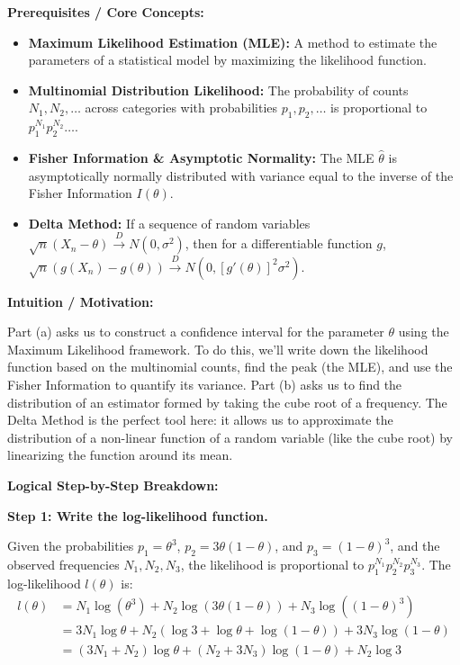 \begin{solution}
\textbf{Prerequisites / Core Concepts:}
\begin{itemize}
    \item \textbf{Maximum Likelihood Estimation (MLE):} A method to estimate the parameters of a statistical model by maximizing the likelihood function.
    \item \textbf{Multinomial Distribution Likelihood:} The probability of counts $N_1, N_2, \dots$ across categories with probabilities $p_1, p_2, \dots$ is proportional to $p_1^{N_1} p_2^{N_2} \dots$.
    \item \textbf{Fisher Information \& Asymptotic Normality:} The MLE $\hat{\theta}$ is asymptotically normally distributed with variance equal to the inverse of the Fisher Information $I(\theta)$.
    \item \textbf{Delta Method:} If a sequence of random variables $\sqrt{n}(X_n - \theta) \xrightarrow{D} N(0, \sigma^2)$, then for a differentiable function $g$, $\sqrt{n}(g(X_n) - g(\theta)) \xrightarrow{D} N(0, [g'(\theta)]^2 \sigma^2)$.
\end{itemize}

\textbf{Intuition / Motivation:}

Part (a) asks us to construct a confidence interval for the parameter $\theta$ using the Maximum Likelihood framework. To do this, we'll write down the likelihood function based on the multinomial counts, find the peak (the MLE), and use the Fisher Information to quantify its variance.
Part (b) asks us to find the distribution of an estimator formed by taking the cube root of a frequency. The Delta Method is the perfect tool here: it allows us to approximate the distribution of a non-linear function of a random variable (like the cube root) by linearizing the function around its mean.

\textbf{Logical Step-by-Step Breakdown:}

\textbf{Step 1: Write the log-likelihood function.}

Given the probabilities $p_1 = \theta^3$, $p_2 = 3\theta(1-\theta)$, and $p_3 = (1-\theta)^3$, and the observed frequencies $N_1, N_2, N_3$, the likelihood is proportional to $p_1^{N_1} p_2^{N_2} p_3^{N_3}$.
The log-likelihood $l(\theta)$ is:
\begin{align*}
l(\theta) &= N_1 \log(\theta^3) + N_2 \log(3\theta(1-\theta)) + N_3 \log((1-\theta)^3) \\
&= 3N_1 \log \theta + N_2 (\log 3 + \log \theta + \log(1-\theta)) + 3N_3 \log(1-\theta) \\
&= (3N_1 + N_2) \log \theta + (N_2 + 3N_3) \log(1-\theta) + N_2 \log 3
\end{align*}


\end{solution}
